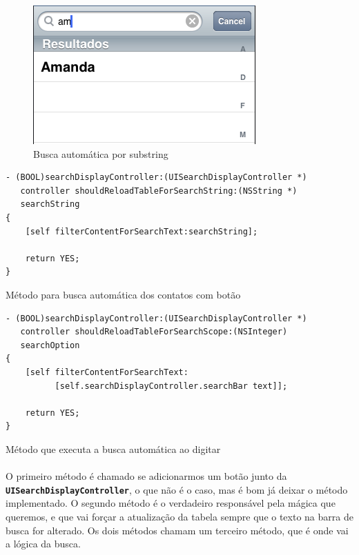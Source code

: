 \documentclass[a4paper,12pt,brazil,doubleside]{book}
\begin{document}
\begin{singlespace}
\bigskip
\bigskip

\begin{figure}[H]
  \centering
  \includegraphics[totalheight=0.25\textheight]{figuras/table/table7.png}
  \caption{Busca automática por substring}
  \label{fig:a}
\end{figure}

\bigskip

\begin{listing}[H]
\begin{verbatim}
- (BOOL)searchDisplayController:(UISearchDisplayController *)
   controller shouldReloadTableForSearchString:(NSString *)
   searchString
{
    [self filterContentForSearchText:searchString];

    return YES;
}
\end{verbatim}
\caption{Método para busca automática dos contatos com botão}
\end{listing}

\bigskip

\begin{listing}[H]
\begin{verbatim}
- (BOOL)searchDisplayController:(UISearchDisplayController *)
   controller shouldReloadTableForSearchScope:(NSInteger)
   searchOption
{
    [self filterContentForSearchText:
          [self.searchDisplayController.searchBar text]];
    
    return YES;
}
\end{verbatim}
\caption{Método que executa a busca automática ao digitar}
\end{listing}

\paragraph{}O primeiro método é chamado se adicionarmos um botão junto da\\
\texttt{\textbf{UISearchDisplayController}}, o que não é o caso, mas é bom já deixar o método implementado. O segundo método é o verdadeiro responsável pela mágica que queremos, e que vai forçar a atualização da tabela sempre que o texto na barra de busca for alterado. Os dois métodos chamam um terceiro método, que é onde vai a lógica da busca.


\end{singlespace}
\end{document}
